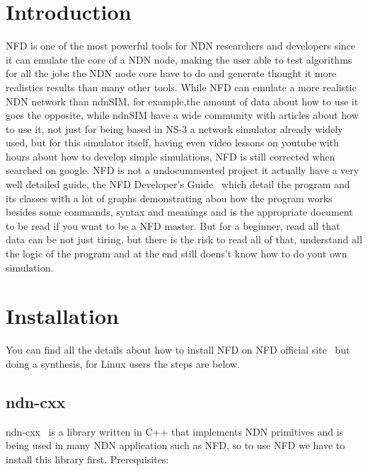 \documentclass[11pt,conference]{./IEEEtran}
\begin{document}
	\section{Introduction}
NFD is one of the most powerful tools for NDN researchers and developers since it can emulate the core of a NDN node, making the user able to test algorithms for all the jobs the NDN node core have to do and generate thought it more realistics results than many other tools. While NFD can emulate a more realistic NDN network than ndnSIM, for example,the amount of data about how to use it goes the opposite, while ndnSIM have a wide community with articles about how to use it, not just for being based in NS-3 a network simulator already widely used, but for this simulator itself, having even video lessons on youtube with hours about how to develop simple simulations, NFD is still corrected when searched on google.
NFD is not a undocummented project it actually have a very well detailed guide, the NFD Developer’s Guide~\cite{devguide} which detail the program and its classes with a lot of graphs demonstrating abou how the program works besides some commands, syntax and meanings and is the appropriate document to be read if you wnat to be a NFD master. But for a beginner, read all that data can be not just tiring, but there is the risk to read all of that, understand all the logic of the program and at the end still doens't know how to do yout own simulation.  
	
	\section{Installation}
You can find all the details about how to install NFD on NFD official site~\cite{NFD} but doing a synthesis, for Linux users the steps are below.

	\subsection{ndn-cxx}
	ndn-cxx~\cite{ndncxx} is a library written in C++ that implements NDN primitives and is being used in many NDN application such as NFD, so to use NFD we have to install this library first.
	Prerequisites:
	
\end{document}
